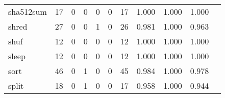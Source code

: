 \begin{longtable}{lp{1.20cm}p{1.20cm}p{1.20cm}p{1.20cm}p{1.20cm}p{1.20cm}p{1.20cm}p{1.20cm}p{1.20cm}p{1.20cm}}
sha512sum &                                    17 &                                                  0 &                                                  0 &                                                  0 &                                                  0 &                                                 17 &                                         1.000 &                                              1.000 &                                              1.000 \\
shred     &                                    27 &                                                  0 &                                                  0 &                                                  1 &                                                  0 &                                                 26 &                                         0.981 &                                              1.000 &                                              0.963 \\
shuf      &                                    12 &                                                  0 &                                                  0 &                                                  0 &                                                  0 &                                                 12 &                                         1.000 &                                              1.000 &                                              1.000 \\
sleep     &                                    12 &                                                  0 &                                                  0 &                                                  0 &                                                  0 &                                                 12 &                                         1.000 &                                              1.000 &                                              1.000 \\
sort      &                                    46 &                                                  0 &                                                  1 &                                                  0 &                                                  0 &                                                 45 &                                         0.984 &                                              1.000 &                                              0.978 \\
split     &                                    18 &                                                  0 &                                                  1 &                                                  0 &                                                  0 &                                                 17 &                                         0.958 &                                              1.000 &                                              0.944 \\

\end{longtable}
